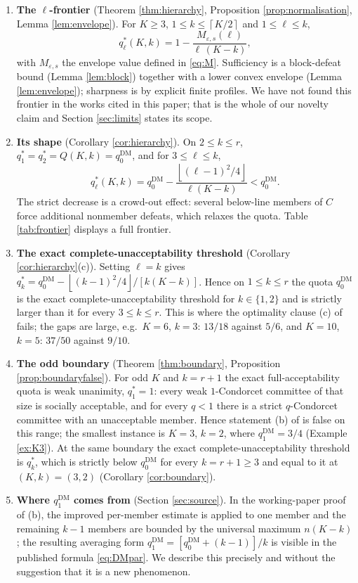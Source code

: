 \documentclass[11pt]{article}
\theoremstyle{plain}
\theoremstyle{definition}
\newcommand{\cl}[1]{\left\lceil #1\right\rceil}
\newcommand{\fl}[1]{\left\lfloor #1\right\rfloor}
\newcommand{\eps}{\varepsilon}
\newcommand{\DM}{\mathrm{DM}}
\begin{document}
\begin{enumerate}[label=(\arabic*)]
\item \textbf{The $\ell$-frontier} (Theorem \ref{thm:hierarchy}, Proposition \ref{prop:normalisation}, Lemma \ref{lem:envelope}). For $K\ge3$, $1\le k\le\cl{K/2}$ and $1\le\ell\le k$,
\[
q_\ell^*(K,k)=1-\frac{M_{\eps,s}(\ell)}{\ell\,(K-k)},
\]
with $M_{\eps,s}$ the envelope value defined in \eqref{eq:M}. Sufficiency is a block-defeat bound (Lemma \ref{lem:block}) together with a lower convex envelope (Lemma \ref{lem:envelope}); sharpness is by explicit finite profiles. We have not found this frontier in the works cited in this paper; that is the whole of our novelty claim and Section \ref{sec:limits} states its scope.
\item \textbf{Its shape} (Corollary \ref{cor:hierarchy}). On $2\le k\le r$, $q_1^*=q_2^*=Q(K,k)=q_0^{\DM}$, and for $3\le\ell\le k$,
\[
q_\ell^*(K,k)=q_0^{\DM}-\frac{\fl{(\ell-1)^2/4}}{\ell(K-k)}<q_0^{\DM}.
\]
The strict decrease is a crowd-out effect: several below-line members of $C$ force additional nonmember defeats, which relaxes the quota. Table \ref{tab:frontier} displays a full frontier.
\item \textbf{The exact complete-unacceptability threshold} (Corollary \ref{cor:hierarchy}(c)). Setting $\ell=k$ gives $q_k^*=q_0^{\DM}-\fl{(k-1)^2/4}/[k(K-k)]$. Hence on $1\le k\le r$ the quota $q_0^{\DM}$ is the exact complete-unacceptability threshold for $k\in\{1,2\}$ and is strictly larger than it for every $3\le k\le r$. This is where the optimality clause (c) of \cite{DissMahajne2020} fails; the gaps are large, e.g.\ $K=6$, $k=3$: $13/18$ against $5/6$, and $K=10$, $k=5$: $37/50$ against $9/10$.
\item \textbf{The odd boundary} (Theorem \ref{thm:boundary}, Proposition \ref{prop:boundaryfalse}). For odd $K$ and $k=r+1$ the exact full-acceptability quota is weak unanimity, $q_1^*=1$: every weak $1$-Condorcet committee of that size is socially acceptable, and for every $q<1$ there is a strict $q$-Condorcet committee with an unacceptable member. Hence statement (b) of \cite{DissMahajne2020} is false on this range; the smallest instance is $K=3$, $k=2$, where $q_1^{\DM}=3/4$ (Example \ref{ex:K3}). At the same boundary the exact complete-unacceptability threshold is $q_k^*$, which is strictly below $q_0^{\DM}$ for every $k=r+1\ge3$ and equal to it at $(K,k)=(3,2)$ (Corollary \ref{cor:boundary}).
\item \textbf{Where $q_1^{\DM}$ comes from} (Section \ref{sec:source}). In the working-paper proof of (b), the improved per-member estimate is applied to one member and the remaining $k-1$ members are bounded by the universal maximum $n(K-k)$; the resulting averaging form $q_1^{\DM}=[q_0^{\DM}+(k-1)]/k$ is visible in the published formula \eqref{eq:DMpar}. We describe this precisely and without the suggestion that it is a new phenomenon.
\end{enumerate}
\end{document}
